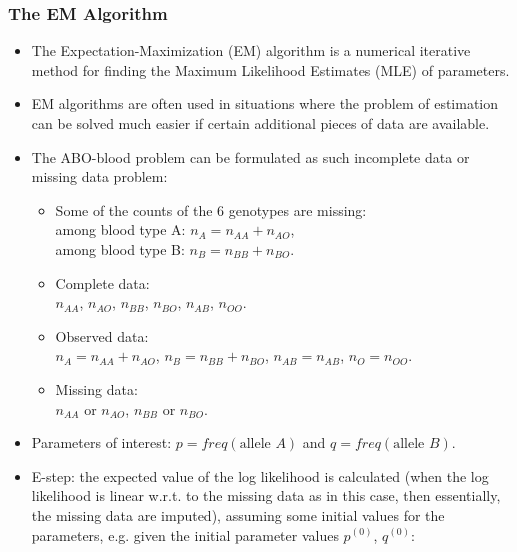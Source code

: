 \documentclass[10pt]{beamer}
\begin{document}
\begin{frame}
\frametitle{The EM Algorithm}
 
\begin{itemize}

\item The Expectation-Maximization (EM) algorithm is a numerical iterative method for finding the Maximum Likelihood Estimates (MLE) of parameters. 
\smallskip

\item EM algorithms are often used in situations where the problem of estimation can be solved much easier if certain additional pieces of data are available. 
\pagebreak

\item The ABO-blood problem can be formulated as such incomplete data or missing data problem: 
\begin{itemize}

\item Some of the  counts of the 6 genotypes are missing:\\
among blood type A: $n_{A}=n_{AA}+n_{AO}$,\\
among blood type B: $n_{B}=n_{BB}+n_{BO}$.
\smallskip

\item Complete data:\\
$n_{AA}$, $n_{AO}$, $n_{BB}$, $n_{BO}$, $n_{AB}$, $n_{OO}$.
\smallskip

\item Observed data:\\
$n_A=n_{AA}+n_{AO}$, $n_B=n_{BB}+n_{BO}$,
$n_{AB}=n_{AB}$, $n_{O}=n_{OO}$.
\smallskip

\item Missing data:\\
$n_{AA}$ or $n_{AO}$, $n_{BB}$ or $n_{BO}$.
\end{itemize}
\bigskip

\item Parameters of interest:
$p=freq(\mbox{allele } A)$ and 
$q=freq(\mbox{allele } B)$.
\pagebreak


\item E-step: the expected value of the log likelihood is calculated (when the log likelihood is linear w.r.t. to the missing data as in this case, then essentially, the missing data are imputed), assuming some initial values for the parameters, e.g. given the initial parameter values $p^{(0)}$, $q^{(0)}$:\\
\bigskip


\end{itemize}
\end{frame}
\end{document}
